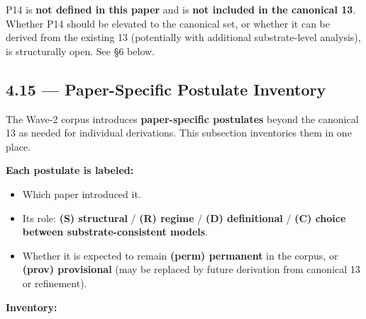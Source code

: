 \documentclass[11pt,a4paper]{article}
\begin{document}
P14 is \textbf{not defined in this paper} and is \textbf{not included in the canonical 13}. Whether P14 should be elevated to the canonical set, or whether it can be derived from the existing 13 (potentially with additional substrate-level analysis), is structurally open. See \S6 below.

\subsection{4.15 --- Paper-Specific Postulate Inventory}

The Wave-2 corpus introduces \textbf{paper-specific postulates} beyond the canonical 13 as needed for individual derivations. This subsection inventories them in one place.

\textbf{Each postulate is labeled:}
\begin{itemize}[noitemsep]
\item Which paper introduced it.
\item Its role: \textbf{(S) structural} / \textbf{(R) regime} / \textbf{(D) definitional} / \textbf{(C) choice between substrate-consistent models}.
\item Whether it is expected to remain \textbf{(perm) permanent} in the corpus, or \textbf{(prov) provisional} (may be replaced by future derivation from canonical 13 or refinement).
\end{itemize}

\textbf{Inventory:}
\end{document}
